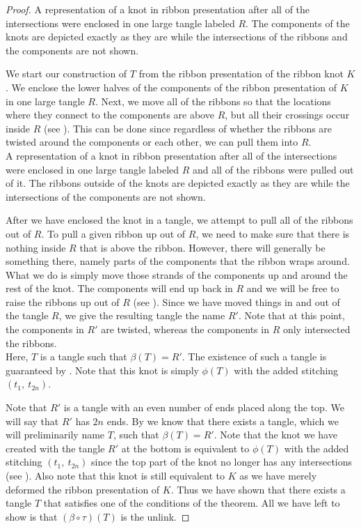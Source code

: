 \begin{paper}
\begin{proof}
{A representation of a knot in ribbon presentation after all of the
intersections were enclosed in one large tangle labeled $R$.
The components of the knots are depicted exactly as they are while the
intersections of the ribbons and the components are not shown.}

We start our construction of $T$ from the ribbon presentation of the ribbon knot
$K$.
We enclose the lower halves of the components of the ribbon presentation of $K$
in one large tangle $R$.
Next, we move all of the ribbons so that the locations where they connect to the
components are above $R$, but all their crossings occur inside $R$
(see \figLowered).
This can be done since regardless of whether the ribbons are twisted around the
components or each other, we can pull them into $R$.\\

{A representation of a knot in ribbon presentation after all of the
intersections were enclosed in one large tangle labeled $R$ and all of the
ribbons were pulled out of it.
The ribbons outside of the knots are depicted exactly as they are while the
intersections of the components are not shown.}

After we have enclosed the knot in a tangle, we attempt to pull all of the
ribbons out of $R$.
To pull a given ribbon up out of $R$, we need to make sure that there is nothing
inside $R$ that is above the ribbon.
However, there will generally be something there, namely parts of the components
that the ribbon wraps around.
What we do is simply move those strands of the components up and around the rest
of the knot.
The components will end up back in $R$ and we will be free to raise the ribbons
up out of $R$ (see \figTwisted).
Since we have moved things in and out of the tangle $R$, we give the resulting
tangle the name $R'$.
Note that at this point, the components in $R'$ are twisted, whereas the
components in $R$ only intersected the ribbons.\\

{Here, $T$ is a tangle such that $\beta(T)=R'$.
The existence of such a tangle is guaranteed by \lemTangles.
Note that this knot is simply $\phi(T)$ with the added stitching
$(t_1,~t_{2n})$.}

Note that $R'$ is a tangle with an even number of ends placed along the top.
We will say that $R'$ has $2n$ ends.
By \lemTangles we know that there exists a tangle, which we will preliminarily
name $T$, such that $\beta(T)=R'$.
Note that the knot we have created with the tangle $R'$ at the bottom is
equivalent to $\phi(T)$ with the added stitching $(t_1,~t_{2n})$ since the top
part of the knot no longer has any intersections (see \figFinal).
Also note that this knot is still equivalent to $K$ as we have merely deformed
the ribbon presentation of $K$.
Thus we have shown that there exists a tangle $T$ that satisfies one of the
conditions of the theorem.
All we have left to show is that $(\beta\circ\tau)(T)$ is the unlink.


\end{proof}
\end{paper}
